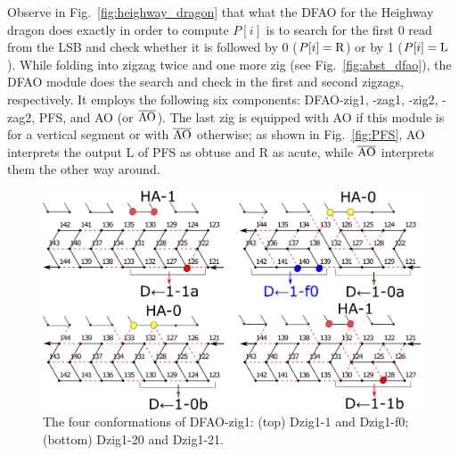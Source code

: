 Observe in Fig.~\ref{fig:heighway_dragon} that what the DFAO for the Heighway dragon does exactly in order to compute $P[i]$ is to search for the first 0 read from the LSB and check whether it is followed by 0 ($P[i] = {\rm R}$) or by 1 ($P[i] = {\rm L}$). 
While folding into zigzag twice and one more zig (see Fig.~\ref{fig:abst_dfao}), the DFAO module does the search and check in the first and second zigzags, respectively.
It employs the following six components: DFAO-zig1, -zag1, -zig2, -zag2, PFS, and AO (or $\overline{\rm AO}$). 
The last zig is equipped with AO if this module is for a vertical segment or with $\overline{\rm AO}$ otherwise; as shown in Fig.~\ref{fig:PFS}, AO interprets the output L of PFS as obtuse and R as acute, while $\overline{\rm AO}$ interprets them the other way around. 

\begin{figure}
\vspace*{-5mm}
\centering
\includegraphics[width=\linewidth]{pic/DFAO-zig1.png}  
\caption{The four conformations of DFAO-zig1: (top) Dzig1-1 and Dzig1-f0; (bottom) Dzig1-20 and Dzig1-21.}
\label{fig:DFAO-zig1}
\vspace*{-3mm}
\end{figure}

